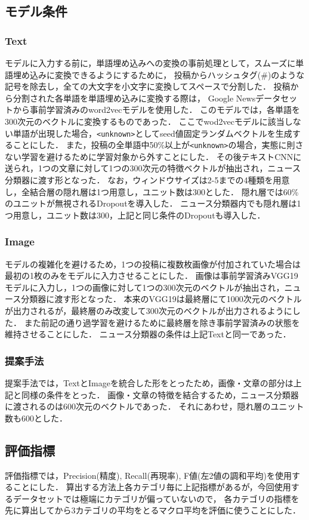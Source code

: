 %
\subsection{モデル条件}
\subsubsection{Text}
モデルに入力する前に，単語埋め込みへの変換の事前処理として，スムーズに単語埋め込みに変換できるようにするために，
投稿からハッシュタグ(\#)のような記号を除去し，全ての大文字を小文字に変換してスペースで分割した．
投稿から分割された各単語を単語埋め込みに変換する際は，
Google Newsデータセットから事前学習済みのword2vecモデル\cite{google_2013}を使用した．
このモデルでは，各単語を300次元のベクトルに変換するものであった．
ここでwod2vecモデルに該当しない単語が出現した場合，\texttt{<unknown>}としてseed値固定ランダムベクトルを生成することにした．
また，投稿の全単語中50\%以上が\texttt{<unknown>}の場合，実態に則さない学習を避けるために学習対象から外すことにした．
その後テキストCNNに送られ，1つの文章に対して1つの300次元の特徴ベクトルが抽出され，ニュース分類器に渡す形となった．
なお，ウィンドウサイズは2-5までの4種類を用意し，全結合層の隠れ層は1つ用意し，ユニット数は300とした．
隠れ層では60\%のユニットが無視されるDropoutを導入した．
ニュース分類器内でも隠れ層は1つ用意し，ユニット数は300，上記と同じ条件のDropoutも導入した．
%
\subsubsection{Image}
モデルの複雑化を避けるため，1つの投稿に複数枚画像が付加されていた場合は最初の1枚のみをモデルに入力させることにした．
画像は事前学習済みVGG19モデルに入力し，1つの画像に対して1つの300次元のベクトルが抽出され，ニュース分類器に渡す形となった．
本来のVGG19は最終層にて1000次元のベクトルが出力されるが，最終層のみ改変して300次元のベクトルが出力されるようにした．
また前記の通り過学習を避けるために最終層を除き事前学習済みの状態を維持させることにした．
ニュース分類器の条件は上記Textと同一であった．
%
\subsubsection{提案手法}
提案手法では，TextとImageを統合した形をとったため，画像・文章の部分は上記と同様の条件をとった．
画像・文章の特徴を結合するため，ニュース分類器に渡されるのは600次元のベクトルであった．
それにあわせ，隠れ層のユニット数も600とした．
%
\subsection{評価指標}
評価指標では，Precision(精度), Recall(再現率), F値(左2値の調和平均)を使用することにした．
算出する方法上各カテゴリ毎に上記指標があるが，今回使用するデータセットでは極端にカテゴリが偏っていないので，
各カテゴリの指標を先に算出してから3カテゴリの平均をとるマクロ平均を評価に使うことにした．

